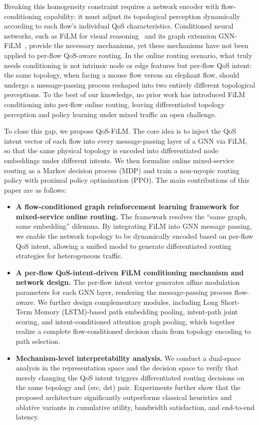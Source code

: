 Breaking this homogeneity constraint requires a network encoder with flow-conditioning capability: it must adjust its topological perception dynamically according to each flow's individual QoS characteristics. Conditioned neural networks, such as FiLM for visual reasoning~\cite{Perez2018_FiLM} and its graph extension GNN-FiLM~\cite{Brockschmidt2020_GNNFiLM}, provide the necessary mechanisms, yet these mechanisms have not been applied to per-flow QoS-aware routing. In the online routing scenario, what truly needs conditioning is not intrinsic node or edge features but per-flow QoS intent: the same topology, when facing a mouse flow versus an elephant flow, should undergo a message-passing process reshaped into two entirely different topological perceptions. To the best of our knowledge, no prior work has introduced FiLM conditioning into per-flow online routing, leaving differentiated topology perception and policy learning under mixed traffic an open challenge.

To close this gap, we propose QoS-FiLM. The core idea is to inject the QoS intent vector of each flow into every message-passing layer of a GNN via FiLM, so that the same physical topology is encoded into differentiated node embeddings under different intents. We then formalize online mixed-service routing as a Markov decision process (MDP) and train a non-myopic routing policy with proximal policy optimization (PPO). The main contributions of this paper are as follows:
\begin{itemize}
    \item \textbf{A flow-conditioned graph reinforcement learning framework for mixed-service online routing.}
    The framework resolves the ``same graph, same embedding'' dilemma. By integrating FiLM into GNN message passing, we enable the network topology to be dynamically encoded based on per-flow QoS intent, allowing a unified model to generate differentiated routing strategies for heterogeneous traffic.

    \item \textbf{A per-flow QoS-intent-driven FiLM conditioning mechanism and network design.}
    The per-flow intent vector generates affine modulation parameters for each GNN layer, rendering the message-passing process flow-aware. We further design complementary modules, including Long Short-Term Memory (LSTM)-based path embedding pooling, intent-path joint scoring, and intent-conditioned attention graph pooling, which together realize a complete flow-conditioned decision chain from topology encoding to path selection.

    \item \textbf{Mechanism-level interpretability analysis.}
    We conduct a dual-space analysis in the representation space and the decision space to verify that merely changing the QoS intent triggers differentiated routing decisions on the same topology and (src, dst) pair. Experiments further show that the proposed architecture significantly outperforms classical heuristics and ablative variants in cumulative utility, bandwidth satisfaction, and end-to-end latency.
\end{itemize}

